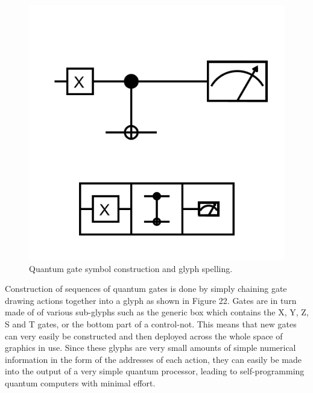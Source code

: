 \documentclass[11pt]{article}
\begin{document}
\begin{figure}

\includegraphics[width=\linewidth]{figures/figure22_gates.png}

\caption{Quantum gate symbol construction and glyph spelling.}
\end{figure}




    Construction of sequences of quantum gates is done by simply chaining gate drawing actions together into a glyph as shown in Figure 22. Gates are in turn made of of various sub-glyphs such as the generic box which contains the X, Y, Z, S and T gates, or the bottom part of a control-not.  This means that new gates can very easily be constructed and then deployed across the whole space of graphics in use.  Since these glyphs are very small amounts of simple numerical information in the form of the addresses of each action, they can easily be made into the output of a very simple quantum processor, leading to self-programming quantum computers with minimal effort.
\end{document}
